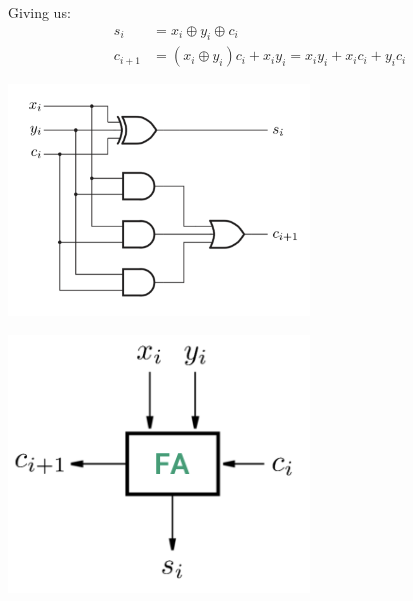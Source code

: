 \documentclass[12pt,openany]{book}
\newcommand*\xor{\oplus}
\begin{document}
							  Giving us:
			      		      \begin{align*}
			      		      	s_i     & = x_i \xor y_i \xor c_i                                     \\
			      		      	c_{i+1} & = (x_i \xor y_i)c_i + x_i y_i = x_i y_i + x_i c_i + y_i c_i 
			      		      \end{align*}
			   

								\begin{minipage}[htp]{0.45\textwidth} %
									\centering
									\includegraphics[width=0.60\textwidth]{circuits/8.1.6.png} %
								\end{minipage}
									\hfill
									\vline
									\hfill
								\begin{minipage}[htp]{0.45\textwidth} %
									\centering
									\includegraphics[width=0.60\textwidth]{circuits/8.1.6_2.png} %
								\end{minipage}
			      		      	
			   
			
			      	
			      	
\end{document}
